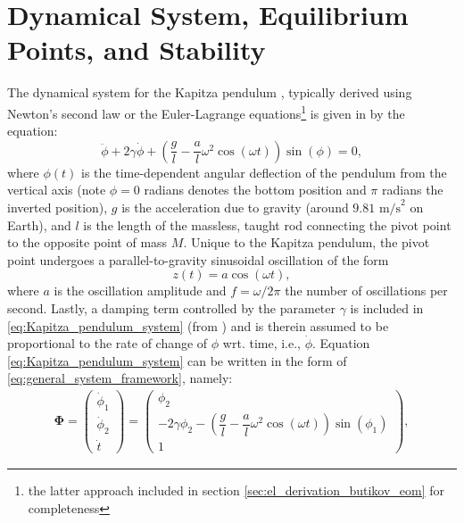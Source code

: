 \documentclass[12pt, letterpaper]{article}
\begin{document}
\section{Dynamical System, Equilibrium Points, and Stability}\label{sec:dny_systems_eq_points_stab}
The dynamical system for the Kapitza pendulum \cite{kapitsa1951jetp}, typically derived using Newton's second law or the Euler-Lagrange equations\footnote{the latter approach included in section \ref{sec:el_derivation_butikov_eom} for completeness} is given in \cite{Butikov2017KapitzaS} by the equation: 
\begin{equation}
    \ddot{\phi} + 2\gamma\dot{\phi} + \left(\dfrac{g}{l} - \dfrac{a}{l}\omega^2 \cos(\omega t)\right)\sin(\phi) = 0            
    \label{eq:Kapitza_pendulum_system},
\end{equation}
where $\phi(t)$ is the time-dependent angular deflection of the pendulum from the vertical axis (note $\phi=0$ radians denotes the bottom position and $\pi$ radians the inverted position), $g$ is the acceleration due to gravity (around \href{https://physics.nist.gov/cgi-bin/cuu/Value?gn}{$9.81 \text{ m/s}^2$} on Earth), and $l$ is the length of the massless, taught rod connecting the pivot point to the opposite point of mass $M$. Unique to the Kapitza pendulum, the pivot point undergoes a parallel-to-gravity sinusoidal oscillation of the form 
\begin{equation}
    z(t) = a\cos(\omega t) \label{eq:pivot_point_osc_function},
\end{equation}
 where $a$ is the oscillation amplitude and $f=\omega/2\pi$ the number of oscillations per second. Lastly, a damping term controlled by the parameter $\gamma$ is included in \ref{eq:Kapitza_pendulum_system} (from \cite{Butikov2017KapitzaS}) and is therein assumed to be proportional to the rate of change of $\phi$ wrt. time, i.e., $\dot{\phi}$. Equation \ref{eq:Kapitza_pendulum_system} can be written in the form of \ref{eq:general_system_framework}, namely: 
\begin{align}
      \bm{\Phi} = \begin{pmatrix} \dot{\phi}_1 \\ \dot{\phi}_2 \\ \dot{t} \end{pmatrix} = \begin{pmatrix} \phi_2 \\ -2\gamma\phi_2 - \left(\dfrac{g}{l} - \dfrac{a}{l}\omega^2 \cos(\omega t)\right)\sin(\phi_1) \\ 1 \end{pmatrix} \label{eq:Kapitza_pendulum_gen_framework_form},
\end{align}
\end{document}
